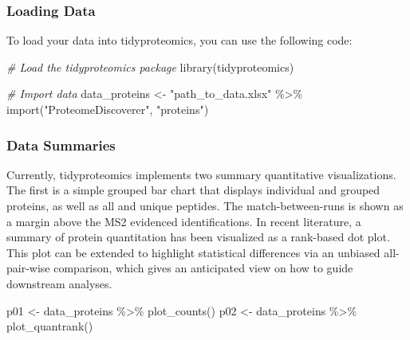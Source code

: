 \documentclass[
]{book}
\newenvironment{Shaded}{\begin{snugshade}}{\end{snugshade}}
\newcommand{\CommentTok}[1]{\textcolor[rgb]{0.56,0.35,0.01}{\textit{#1}}}
\newcommand{\FunctionTok}[1]{\textcolor[rgb]{0.00,0.00,0.00}{#1}}
\newcommand{\NormalTok}[1]{#1}
\newcommand{\OtherTok}[1]{\textcolor[rgb]{0.56,0.35,0.01}{#1}}
\newcommand{\SpecialCharTok}[1]{\textcolor[rgb]{0.00,0.00,0.00}{#1}}
\newcommand{\StringTok}[1]{\textcolor[rgb]{0.31,0.60,0.02}{#1}}
\begin{document}
\hypertarget{loading-data-1}{%
\subsubsection*{Loading Data}\label{loading-data-1}}

To load your data into tidyproteomics, you can use the following code:

\begin{Shaded}
\begin{Highlighting}[]
\CommentTok{\# Load the tidyproteomics package}
\FunctionTok{library}\NormalTok{(tidyproteomics)}

\CommentTok{\# Import data}
\NormalTok{data\_proteins }\OtherTok{\textless{}{-}} \StringTok{"path\_to\_data.xlsx"} \SpecialCharTok{\%\textgreater{}\%}
  \FunctionTok{import}\NormalTok{(}\StringTok{"ProteomeDiscoverer"}\NormalTok{, }\StringTok{"proteins"}\NormalTok{) }
\end{Highlighting}
\end{Shaded}

\hypertarget{data-summaries}{%
\subsubsection*{Data Summaries}\label{data-summaries}}

Currently, tidyproteomics implements two summary quantitative visualizations. The first is a simple grouped bar chart that displays individual and grouped proteins, as well as all and unique peptides. The match-between-runs is shown as a margin above the MS2 evidenced identifications. In recent literature, a summary of protein quantitation has been visualized as a rank-based dot plot. This plot can be extended to highlight statistical differences via an unbiased all-pair-wise comparison, which gives an anticipated view on how to guide downstream analyses.

\begin{Shaded}
\begin{Highlighting}[]
\NormalTok{p01 }\OtherTok{\textless{}{-}}\NormalTok{ data\_proteins }\SpecialCharTok{\%\textgreater{}\%} \FunctionTok{plot\_counts}\NormalTok{()}
\NormalTok{p02 }\OtherTok{\textless{}{-}}\NormalTok{ data\_proteins }\SpecialCharTok{\%\textgreater{}\%} \FunctionTok{plot\_quantrank}\NormalTok{()}
\end{Highlighting}
\end{Shaded}
\end{document}
